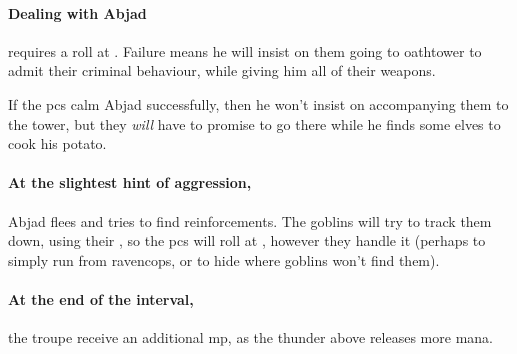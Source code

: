 \begin{multicols}{2}

\paragraph{Dealing with Abjad}
requires a  roll at \tn[9].
Failure means he will insist on them going to \gls{oathtower} to admit their criminal behaviour, while giving him all of their \glspl{weapon}.

If the \glspl{pc} calm Abjad successfully, then he won't insist on accompanying them to the tower, but they \emph{will} have to promise to go there while he finds some elves to cook his potato.

\paragraph{At the slightest hint of aggression,}
Abjad flees and tries to find reinforcements.
The goblins will try to track them down, using their , so the \glspl{pc} will roll at \tn, however they handle it (perhaps  to simply run from \gls{ravencops}, or  to hide where goblins won't find them).

\paragraph{At the end of the \gls{interval},}
the troupe receive an additional \gls{mp}, as the thunder above releases more mana.


\end{multicols}

\stopcontents[segments]
